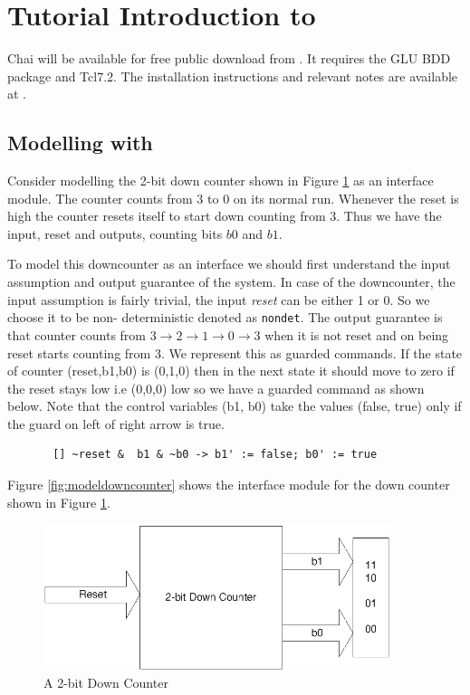 \section{Tutorial Introduction to \chai}
Chai will be available for free public download from
\cite{getchai}. It requires the GLU BDD package and Tcl7.2. The
installation instructions and relevant notes are available at
\cite{getchai}.

\subsection{Modelling with \chai}
Consider modelling the 2-bit down counter shown in Figure
\ref{fig:downcounter} as an interface module. The counter counts
from 3 to 0 on its normal run. Whenever the reset is high the
counter resets itself to start down counting from 3. Thus we have
the input, reset and outputs, counting bits $b0$ and $b1$.

To model this downcounter as an interface we should first
understand the input assumption and output guarantee of the
system. In case of the downcounter, the input assumption is fairly
trivial, the input \emph{reset} can be either 1 or 0. So we choose
it to be non- deterministic denoted as \texttt{nondet}. The output
guarantee is that counter counts from $3 \rightarrow 2 \rightarrow
1 \rightarrow 0 \rightarrow 3$ when it is not reset and on being
reset starts counting from 3. We represent this as guarded
commands. If the state of counter (reset,b1,b0) is (0,1,0) then in
the next state it should move to zero if the reset stays low i.e
(0,0,0) low so we have a guarded command as shown below. Note that
the control variables (b1, b0) take the values (false, true) only
if the guard on left of right arrow is true.
\begin{verbatim}
       [] ~reset &  b1 & ~b0 -> b1' := false; b0' := true
\end{verbatim}

Figure \ref{fig:modeldowncounter} shows the interface module for
the down counter shown in Figure \ref{fig:downcounter}.

\begin{figure}[htbp]
\centering
\includegraphics[width=4in]{figs/downcounter}
\caption{A 2-bit Down Counter}
\label{fig:downcounter}
\end{figure}


